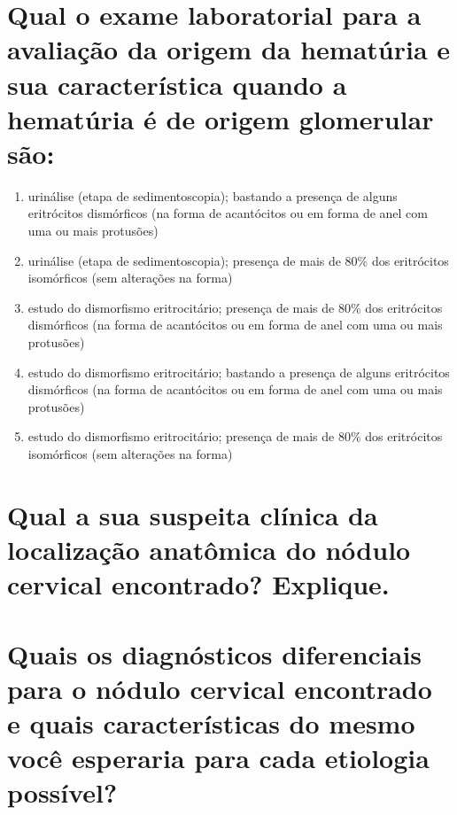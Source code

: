 \documentclass[11pt,notitlepage]{article}
\begin{document}
\section{Qual o exame laboratorial para a avaliação da origem da hematúria e sua característica quando a hematúria é de origem glomerular são:}
\begin{multicols}{2}
	\setlength{\columnseprule}{0pt}
	\begin{enumerate}[label=(\alph*)]
		\item urinálise (etapa de sedimentoscopia); bastando a presença de alguns eritrócitos dismórficos (na forma de acantócitos ou em forma de anel com uma ou mais protusões)
		\item urinálise (etapa de sedimentoscopia); presença de mais de 80\% dos eritrócitos isomórficos (sem alterações na forma)
		\item estudo do dismorfismo eritrocitário; presença de mais de 80\% dos eritrócitos dismórficos (na forma de acantócitos ou em forma de anel com uma ou mais protusões)
		\item estudo do dismorfismo eritrocitário; bastando a presença de alguns eritrócitos dismórficos (na forma de acantócitos ou em forma de anel com uma ou mais protusões)
		\item estudo do dismorfismo eritrocitário; presença de mais de 80\% dos eritrócitos isomórficos (sem alterações na forma)
	\end{enumerate}
\end{multicols}
\vspace{0.5cm}

\section{Qual a sua suspeita clínica da localização anatômica do nódulo cervical encontrado? Explique.}
\noindent\makebox[\linewidth]{\rule{\textwidth}{0.5pt}}
\noindent\makebox[\linewidth]{\rule{\textwidth}{0.5pt}}
\vspace{0.5cm}

\section{Quais os diagnósticos diferenciais para o nódulo cervical encontrado e quais características do mesmo você esperaria para cada etiologia possível?}
\noindent\makebox[\linewidth]{\rule{\textwidth}{0.5pt}}
\noindent\makebox[\linewidth]{\rule{\textwidth}{0.5pt}}
\noindent\makebox[\linewidth]{\rule{\textwidth}{0.5pt}}
\vspace{0.5cm}
\end{document}
